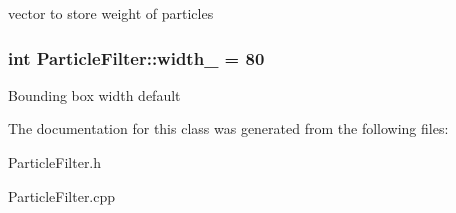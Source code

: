 vector to store weight of particles \hypertarget{classParticleFilter_ae4baf27a40a3b7a3def7402dfaba3908}{
\subsubsection[{width\-\_\-}]{\setlength{\rightskip}{0pt plus 5cm}int Particle\-Filter\-::width\-\_\- = 80\hspace{0.3cm}{\ttfamily [protected]}}}\label{classParticleFilter_ae4baf27a40a3b7a3def7402dfaba3908}
Bounding box width default 

The documentation for this class was generated from the following files\-:\begin{DoxyCompactItemize}
\item 
Particle\-Filter.\-h\item 
Particle\-Filter.\-cpp\end{DoxyCompactItemize}
